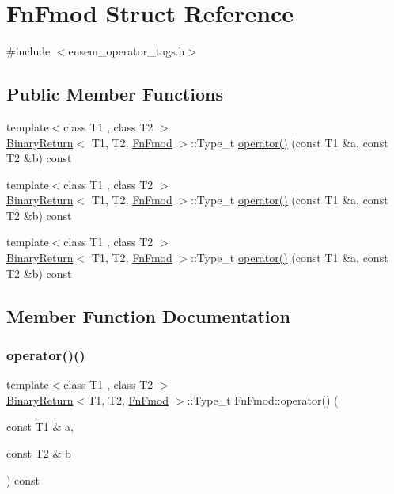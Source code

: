 \hypertarget{structFnFmod}{}\section{Fn\+Fmod Struct Reference}
\label{structFnFmod}


{\ttfamily \#include $<$ensem\+\_\+operator\+\_\+tags.\+h$>$}

\subsection*{Public Member Functions}
\begin{DoxyCompactItemize}
\item 
{\footnotesize template$<$class T1 , class T2 $>$ }\\\mbox{\hyperlink{structBinaryReturn}{Binary\+Return}}$<$ T1, T2, \mbox{\hyperlink{structFnFmod}{Fn\+Fmod}} $>$\+::Type\+\_\+t \mbox{\hyperlink{structFnFmod_a9eb37a001ef170a6ad8ce1fcc2feec5e}{operator()}} (const T1 \&a, const T2 \&b) const
\item 
{\footnotesize template$<$class T1 , class T2 $>$ }\\\mbox{\hyperlink{structBinaryReturn}{Binary\+Return}}$<$ T1, T2, \mbox{\hyperlink{structFnFmod}{Fn\+Fmod}} $>$\+::Type\+\_\+t \mbox{\hyperlink{structFnFmod_a9eb37a001ef170a6ad8ce1fcc2feec5e}{operator()}} (const T1 \&a, const T2 \&b) const
\item 
{\footnotesize template$<$class T1 , class T2 $>$ }\\\mbox{\hyperlink{structBinaryReturn}{Binary\+Return}}$<$ T1, T2, \mbox{\hyperlink{structFnFmod}{Fn\+Fmod}} $>$\+::Type\+\_\+t \mbox{\hyperlink{structFnFmod_a9eb37a001ef170a6ad8ce1fcc2feec5e}{operator()}} (const T1 \&a, const T2 \&b) const
\end{DoxyCompactItemize}


\subsection{Member Function Documentation}
\mbox{\label{structFnFmod_a9eb37a001ef170a6ad8ce1fcc2feec5e}} 
\subsubsection{\texorpdfstring{operator()()}{operator()()}\hspace{0.1cm}{\footnotesize\ttfamily [1/3]}}
{\footnotesize\ttfamily template$<$class T1 , class T2 $>$ \\
\mbox{\hyperlink{structBinaryReturn}{Binary\+Return}}$<$T1, T2, \mbox{\hyperlink{structFnFmod}{Fn\+Fmod}} $>$\+::Type\+\_\+t Fn\+Fmod\+::operator() (\begin{DoxyParamCaption}\item[{const T1 \&}]{a,  }\item[{const T2 \&}]{b }\end{DoxyParamCaption}) const\hspace{0.3cm}{\ttfamily [inline]}}

